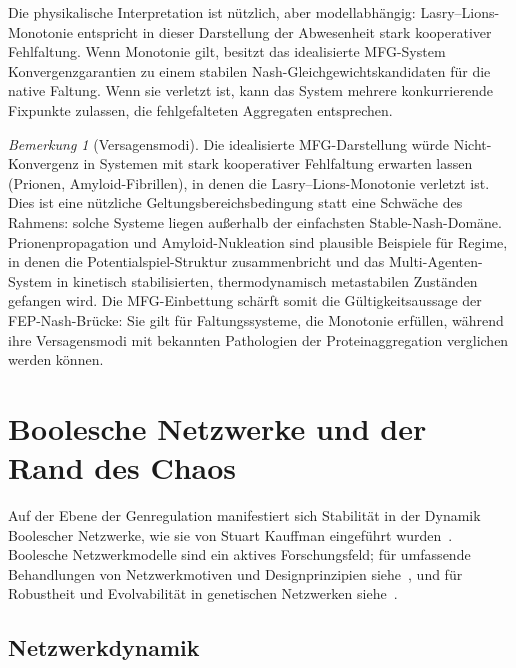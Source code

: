 \documentclass[12pt,a4paper]{article}
\theoremstyle{remark}
\newtheorem{remark}{Bemerkung}
\begin{document}
Die physikalische Interpretation ist nützlich, aber modellabhängig: Lasry--Lions-Monotonie entspricht in dieser Darstellung der Abwesenheit stark kooperativer Fehlfaltung. Wenn Monotonie gilt, besitzt das idealisierte MFG-System Konvergenzgarantien zu einem stabilen Nash-Gleichgewichtskandidaten für die native Faltung. Wenn sie verletzt ist, kann das System mehrere konkurrierende Fixpunkte zulassen, die fehlgefalteten Aggregaten entsprechen.

\begin{remark}[Versagensmodi]\label{rem:mfg-failure}
Die idealisierte MFG-Darstellung würde Nicht-Konvergenz in Systemen mit stark kooperativer Fehlfaltung erwarten lassen (Prionen, Amyloid-Fibrillen), in denen die Lasry--Lions-Monotonie verletzt ist. Dies ist eine nützliche Geltungsbereichsbedingung statt eine Schwäche des Rahmens: solche Systeme liegen außerhalb der einfachsten Stable-Nash-Domäne. Prionenpropagation und Amyloid-Nukleation sind plausible Beispiele für Regime, in denen die Potentialspiel-Struktur zusammenbricht und das Multi-Agenten-System in kinetisch stabilisierten, thermodynamisch metastabilen Zuständen gefangen wird. Die MFG-Einbettung schärft somit die Gültigkeitsaussage der FEP-Nash-Brücke: Sie gilt für Faltungssysteme, die Monotonie erfüllen, während ihre Versagensmodi mit bekannten Pathologien der Proteinaggregation verglichen werden können.
\end{remark}

\section{Boolesche Netzwerke und der Rand des Chaos}
\label{sec:boolean}

Auf der Ebene der Genregulation manifestiert sich Stabilität in der Dynamik Boolescher Netzwerke, wie sie von Stuart Kauffman eingeführt wurden~\citep{BooleanPost,KauffmanOrigins}. Boolesche Netzwerkmodelle sind ein aktives Forschungsfeld; für umfassende Behandlungen von Netzwerkmotiven und Designprinzipien siehe~\citet{AlonSystems2007}, und für Robustheit und Evolvabilität in genetischen Netzwerken siehe~\citet{WagnerRobustness2005}.

\subsection{Netzwerkdynamik}
\end{document}
